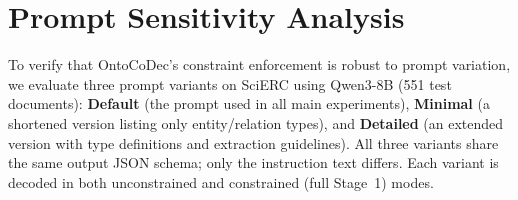 \section{Prompt Sensitivity Analysis}
\label{app:prompt-sensitivity}

To verify that OntoCoDec's constraint enforcement is robust to prompt variation, we evaluate three prompt variants on SciERC using Qwen3-8B (551 test documents): \textbf{Default} (the prompt used in all main experiments), \textbf{Minimal} (a shortened version listing only entity/relation types), and \textbf{Detailed} (an extended version with type definitions and extraction guidelines). All three variants share the same output JSON schema; only the instruction text differs. Each variant is decoded in both unconstrained and constrained (full Stage~1) modes.

